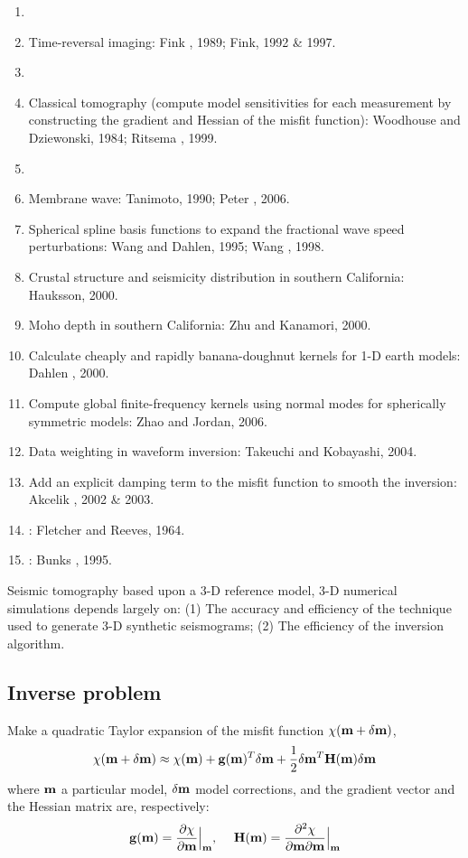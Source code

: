 \begin{enumerate}[\hspace{10mm*}]
  \item \sline
  \item Time-reversal imaging: Fink \etal, 1989; Fink, 1992 \& 1997.
  \item \sline
  \item Classical tomography (compute model sensitivities for each measurement
    by constructing the gradient and Hessian of the misfit function):
    Woodhouse and Dziewonski, 1984; Ritsema \etal, 1999.
  \item \sline
  \item Membrane wave: Tanimoto, 1990; Peter \etal, 2006.
  \item Spherical spline basis functions to expand the fractional wave speed perturbations:
    Wang and Dahlen, 1995; Wang \etal, 1998.
  \item Crustal structure and seismicity distribution in southern California: Hauksson, 2000.
  \item Moho depth in southern California: Zhu and Kanamori, 2000.
  \item Calculate cheaply and rapidly banana-doughnut kernels for 1-D earth models:
    Dahlen \etal, 2000.
  \item Compute global finite-frequency kernels using normal modes
    for spherically symmetric models: Zhao and Jordan, 2006.
  \item Data weighting in waveform inversion: Takeuchi and Kobayashi, 2004.
  \item Add an explicit damping term to the misfit function to smooth the inversion:
    Akcelik \etal, 2002 \& 2003.
  \item {}: Fletcher and Reeves, 1964.
  \item {}: Bunks \etal, 1995.
\end{enumerate}

Seismic tomography based upon a 3-D reference model, 3-D numerical simulations depends largely on:
(1) The accuracy and efficiency of the technique used to generate 3-D synthetic seismograms;
(2) The efficiency of the inversion algorithm.

\subsection{Inverse problem}
Make a quadratic Taylor expansion of the misfit function $\chi(\mathbf{m}+\delta\mathbf{m})$,
\[ \chi(\mathbf{m}+\delta\mathbf{m})\approx\chi(\mathbf{m})+\mathbf{g}(\mathbf{m})^T\delta\mathbf{m}+\frac{1}{2}\delta\mathbf{m}^T\mathbf{H}(\mathbf{m})\delta\mathbf{m} \]
where $\mathbf{m}$ a particular model, $\delta\mathbf{m}$ model corrections,
and the gradient vector and the Hessian matrix are, respectively:
\[ \mathbf{g}(\mathbf{m})=\frac{\partial\chi}{\partial\mathbf{m}}\Big|_{\mathbf{m}} \text{,\hspace{5mm}} \mathbf{H}(\mathbf{m})=\frac{\partial^2\chi}{\partial\mathbf{m}\partial\mathbf{m}}\Big|_{\mathbf{m}} \]

